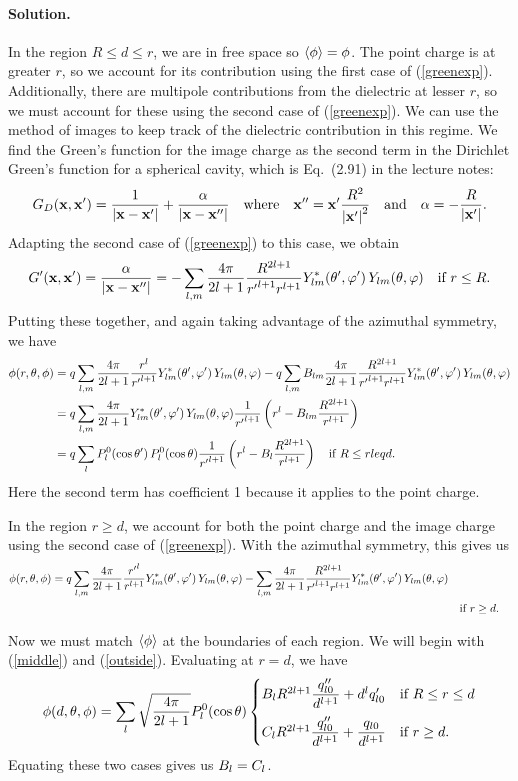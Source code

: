 \documentclass[11pt]{article}
\newcommand{\refeq}[1]{(\ref{#1})}
\newcommand{\beq}{\begin{equation*}}
\newcommand{\eeq}{\end{equation*}}
\newenvironment{solution}
{
    \paragraph{Solution.}
    \ignorespaces
}
{
    \bigskip
}
\begin{document}
\begin{solution}
	In the region $R \leq d \leq r$, we are in free space so $\evphi = \phi$.  The point charge is at greater $r$, so we account for its contribution using the first case of \refeq{greenexp}.  Additionally, there are multipole contributions from the dielectric at lesser $r$, so we must account for these using the second case of \refeq{greenexp}.  We can use the method of images to keep track of the dielectric contribution in this regime.  We find the Green's function for the image charge as the second term in the Dirichlet Green's function for a spherical cavity, which is Eq.~(2.91) in the lecture notes:
	\beq
		\Gdxxp = \frac{1}{\abs{\vx - \vx'}} + \frac{\alp}{\abs{\vx - \vx''}}
		\qq{where} \vx'' = \vx' \frac{R^2}{\abs{\vx'}^2}
		\qand \alp = -\frac{R}{\abs{\vx'}}.
	\eeq
	Adapting the second case of \refeq{greenexp} to this case, we obtain
	\beq
		\Gpxxp = \frac{\alp}{\abs{\vx - \vx''}}
		= -\sum_{l,m} \frac{4\pi}{2l + 1} \frac{R^{2l+1}}{{r'}^{l+1} r^{l + 1}} \Ylm^*\tvp \, \Ylm\tv \quad \tif r \leq R.
	\eeq
	Putting these together, and again taking advantage of the azimuthal symmetry, we have
	\begin{align}
		\phi(r, \theta, \phi) &= q \sum_{l,m} \frac{4\pi}{2l + 1} \frac{r^l}{{r'}^{l + 1}} Y_{l m}^*(\theta', \varphi') \, Y_{l m}(\theta, \varphi) - q \sum_{l,m} B_{l m} \frac{4\pi}{2l + 1} \frac{R^{2l+1}}{{r'}^{l+1} r^{l + 1}} Y_{l m}^*(\theta', \varphi') \, Y_{l m}(\theta, \varphi) \notag \\
		&= q \sum_{l,m} \frac{4\pi}{2l + 1} Y_{l m}^*(\theta', \varphi') \, Y_{l m}(\theta, \varphi) \frac{1}{{r'}^{l+1}} \left( r^l - B_{l m} \frac{R^{2l+1}}{r^{l+1}} \right) \notag \\
		&= q \sum_{l} P_l^0(\cos\theta') \, P_l^0(\cos\theta) \frac{1}{{r'}^{l+1}} \left( r^l - B_l \frac{R^{2l+1}}{r^{l+1}} \right) \quad \text{if } R \leq r leq d. \label{middle}
	\end{align}
	Here the second term has coefficient 1 because it applies to the point charge.
	
	In the region $r \geq d$, we account for both the point charge and the image charge using the second case of \refeq{greenexp}.  With the azimuthal symmetry, this gives us
	\begin{align} \label{outside}
		\phi(r, \theta, \phi) = q \sum_{l,m} \dfrac{4\pi}{2l + 1} \dfrac{{r'}^l}{r^{l + 1}} Y_{l m}^*(\theta', \varphi') \, Y_{l m}(\theta, \varphi) - \sum_{l,m} \frac{4\pi}{2l + 1} \frac{R^{2l+1}}{{r'}^{l+1} r^{l + 1}} Y_{l m}^*(\theta', \varphi') \, Y_{l m}(\theta, \varphi) \notag \\
		& \quad \text{if } r \geq d.
	\end{align}
	
	Now we must match $\evphi$ at the boundaries of each region.  We will begin with \refeq{middle} and \refeq{outside}.  Evaluating at $r = d$, we have
	\beq
		\phi(d, \tht, \phi) = \sum_{l} \sqrt{\frac{4\pi}{2l+1}} \Ploct \begin{cases}
			\Bl R^{2l+1} \dfrac{\qpplo}{d^{l+1}} + d^l \qplo & \tif R \leq r \leq d \\[2ex]
			\Cl R^{2l+1} \dfrac{\qpplo}{d^{l+1}} + \dfrac{\qlo}{d^{l+1}} & \tif r \geq d.
		\end{cases}
	\eeq
	Equating these two cases gives us $B_l = C_l$.
	

\end{solution}
\end{document}
